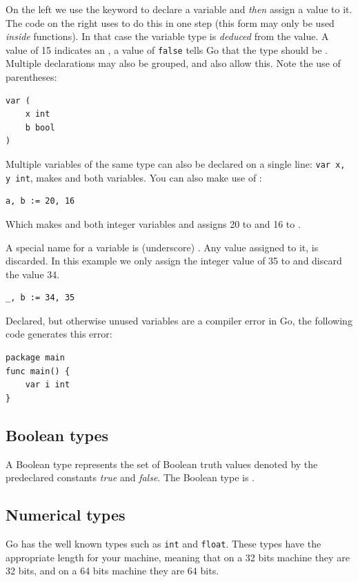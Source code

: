 On the left we use the
 keyword to declare a variable and \emph{then} assign a value to
it. The code on the right uses \mbox{\key{:=}{ }} to do this in one
step (this form may only be used \emph{inside} functions).
In that case the variable
type is \emph{deduced} from the value. A value of 15 indicates an ,
a value of \texttt{false} tells Go that the type should be . 
Multiple  declarations may also be grouped, 
and  also allow this. Note the use of parentheses:
\begin{lstlisting}
var (
    x int
    b bool
)
\end{lstlisting}
Multiple variables of the same type can also be declared on a
single line: \lstinline{var x, y int}, makes  and  both
 variables. You can also make use of :
\begin{lstlisting}
a, b := 20, 16
\end{lstlisting}
Which makes  and  both integer variables and assigns
20 to  and 16 to .

A special name for a variable is \var{\textbf{\_}} 
(underscore) . Any value
assigned to it, is discarded. In this example we only assign the integer
value of 35 to  and discard the value 34.
\begin{lstlisting}
_, b := 34, 35
\end{lstlisting}
Declared, but otherwise unused variables are a compiler error in Go, the
following code generates this error:

\begin{lstlisting}
package main
func main() { 
    var i int
}
\end{lstlisting}

\subsection{Boolean types}
A Boolean type represents the set of Boolean truth values denoted by the
predeclared constants \emph{true} and \emph{false}. The Boolean type is .

\subsection{Numerical types}
Go has the well known types such as \lstinline{int} and
\lstinline{float}. These types have the appropriate length for your
machine, meaning that on a 32 bits machine they are 32 bits, and on
a 64 bits machine they are 64 bits.

